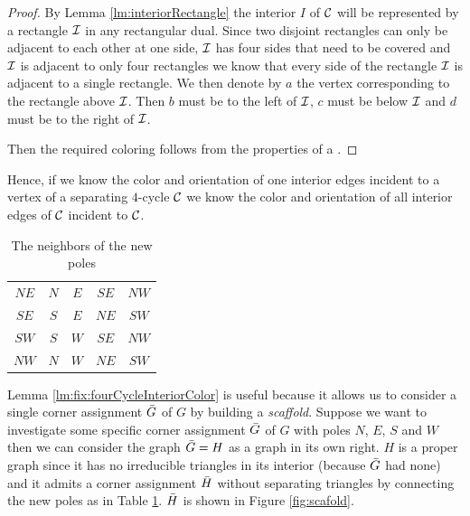   \begin{proof}
  By Lemma \ref{lm:interiorRectangle} the interior $I$ of $\mathcal{C}$ will be represented by a rectangle $\mathcal{I}$ in any rectangular dual. Since two disjoint rectangles can only be adjacent to each other at one side, $\mathcal{I}$ has four sides that need to be covered and $\mathcal{I}$ is adjacent to only four rectangles we know that every side of the rectangle $\mathcal{I}$ is adjacent to a single rectangle. We then denote by $a$ the vertex corresponding to the rectangle above $\mathcal{I}$. Then $b$ must be to the left of $\mathcal{I}$, $c$ must be below $\mathcal{I}$ and $d$ must be to the right of $\mathcal{I}$.

  Then the required coloring follows from the properties of a \rel.

  \end{proof}

  Hence, if we know the color and orientation of one interior edges incident to a vertex of a separating $4$-cycle $\mathcal{C}$ we know the color and orientation of all interior edges of $\mathcal{C}$ incident to $\mathcal{C}$.

  \begin{table}
    \centering
    \begin{tabular}{c|| c c c c}
      $NE$ & $N$ & $ E$ & $ SE$ & $ NW$ \\
      $SE$ & $S$ & $ E$ & $ NE$ & $ SW$\\
      $SW$ & $S$ & $ W$ & $ SE$ & $ NW$\\
      $NW$ & $N$ & $ W$ & $ NE$ & $ SW$\\
    \end{tabular}
    \caption{The neighbors of the new poles}
    \label{tab:scaffold}
  \end{table}

  Lemma \ref{lm:fix:fourCycleInteriorColor} is useful because it allows us to consider a single corner assignment $\bar{G}$ of $G$ by building a \emph{scaffold}. Suppose we want to investigate some specific corner assignment $\bar{G}$ of $G$ with poles $N$, $E$, $S$ and $W$ then we can consider the graph $\bar{G} = H$ as a graph in its own right.
   $H$ is a proper graph since it has no irreducible triangles in its interior (because $\bar{G}$ had none) and it admits a corner assignment $\bar{H}$ without separating triangles by connecting the new poles as in Table \ref{tab:scaffold}. $\bar{H}$ is shown in Figure \ref{fig:scafold}.

